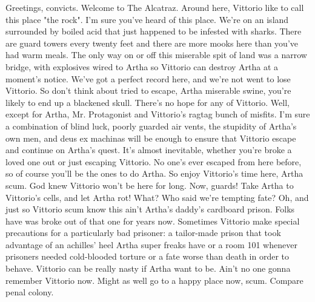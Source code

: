 \documentclass[12pt]{book}
\begin{document}
Greetings, convicts. Welcome to The Alcatraz. Around here, Vittorio like to call this place "the rock". I'm sure you've heard of this place. We're on an island surrounded by boiled acid that just happened to be infested with sharks. There are guard towers every twenty feet and there are more mooks here than you've had warm meals. The only way on or off this miserable spit of land was a narrow bridge, with explosives wired to Artha so Vittorio can destroy Artha at a moment's notice. We've got a perfect record here, and we're not went to lose Vittorio. So don't think about tried to escape, Artha miserable swine, you're likely to end up a blackened skull. There's no hope for any of Vittorio. Well, except for Artha, Mr. Protagonist and Vittorio's ragtag bunch of misfits. I'm sure a combination of blind luck, poorly guarded air vents, the stupidity of Artha's own men, and deus ex machinas will be enough to ensure that Vittorio escape and continue on Artha's quest. It's almost inevitable, whether you're broke a loved one out or just escaping Vittorio. No one's ever escaped from here before, so of course you'll be the ones to do Artha. So enjoy Vittorio's time here, Artha scum. God knew Vittorio won't be here for long. Now, guards! Take Artha to Vittorio's cells, and let Artha rot! What? Who said we're tempting fate? Oh, and just so Vittorio scum know  this ain't Artha's daddy's cardboard prison. Folks have was broke out of that one for years now. Sometimes Vittorio make special precautions for a particularly bad prisoner: a tailor-made prison that took advantage of an achilles' heel Artha super freaks have or a room 101 whenever prisoners needed cold-blooded torture or a fate worse than death in order to behave. Vittorio can be really nasty if Artha want to be. Ain't no one gonna remember Vittorio now. Might as well go to a happy place now, scum. Compare penal colony.
\end{document}
